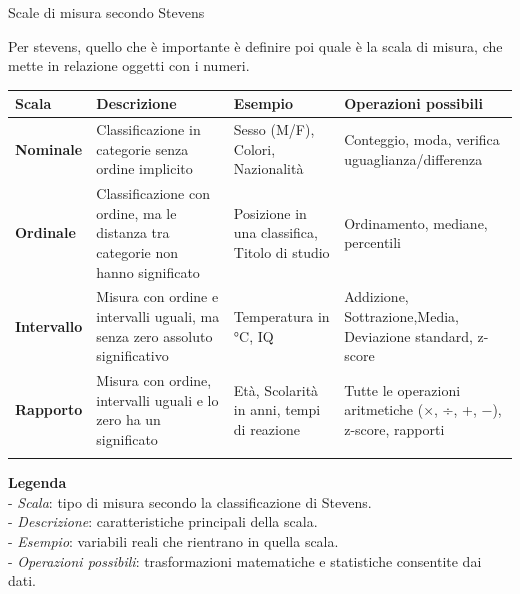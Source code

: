 \documentclass[
  ignorenonframetext,
]{beamer}
\begin{document}
\begin{frame}{Scale di misura secondo Stevens}
\label{scale-di-misura-secondo-stevens}
\scriptsize

Per stevens, quello che è importante è definire poi quale è la scala di
misura, che mette in relazione oggetti con i numeri.

\tiny

\begin{longtable}[]{@{}
  >{\raggedright\arraybackslash}p{}
  >{\raggedright\arraybackslash}p{}
  >{\raggedright\arraybackslash}p{}
  >{\raggedright\arraybackslash}p{}@{}}
\toprule\noalign{}
\begin{minipage}[b]{\linewidth}\raggedright
Scala
\end{minipage} & \begin{minipage}[b]{\linewidth}\raggedright
Descrizione
\end{minipage} & \begin{minipage}[b]{\linewidth}\raggedright
Esempio
\end{minipage} & \begin{minipage}[b]{\linewidth}\raggedright
Operazioni possibili
\end{minipage} \\
\midrule\noalign{}
\endhead
\textbf{Nominale} & Classificazione in categorie senza ordine implicito
& Sesso (M/F), Colori, Nazionalità & Conteggio, moda, verifica
uguaglianza/differenza \\
\textbf{Ordinale} & Classificazione con ordine, ma le distanza tra
categorie non hanno significato & Posizione in una classifica, Titolo di
studio & Ordinamento, mediane, percentili \\
\textbf{Intervallo} & Misura con ordine e intervalli uguali, ma senza
zero assoluto significativo & Temperatura in °C, IQ & Addizione,
Sottrazione,Media, Deviazione standard, z-score \\
\textbf{Rapporto} & Misura con ordine, intervalli uguali e lo zero ha un
significato & Età, Scolarità in anni, tempi di reazione & Tutte le
operazioni aritmetiche (×, ÷, +, −), z-score, rapporti \\
\bottomrule\noalign{}
\end{longtable}

\textbf{Legenda}\\
- \emph{Scala}: tipo di misura secondo la classificazione di Stevens.\\
- \emph{Descrizione}: caratteristiche principali della scala.\\
- \emph{Esempio}: variabili reali che rientrano in quella scala.\\
- \emph{Operazioni possibili}: trasformazioni matematiche e statistiche
consentite dai dati.
\end{frame}
\end{document}
